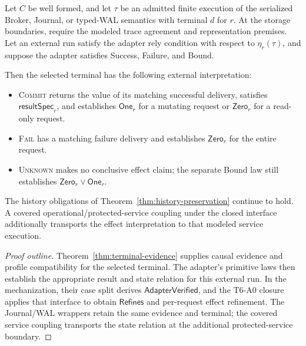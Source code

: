 \documentclass[acmsmall,screen,review,anonymous]{acmart}
\newcommand{\Unknown}{\textsc{Unknown}\xspace}
\newcommand{\Commit}{\textsc{Commit}\xspace}
\newcommand{\Fail}{\textsc{Fail}\xspace}
\begin{document}
\begin{theorem}
\label{thm:authorization-to-effect}
Let $C$ be well formed, and let $\tau$ be an admitted finite execution
of the serialized Broker, Journal, or typed-WAL semantics with terminal
$d$ for $r$. At the storage boundaries, require the modeled trace
agreement and representation premises. Let an external run satisfy
the adapter rely condition with respect to $\eta_r(\tau)$, and suppose
the adapter satisfies Success, Failure, and Bound.

Then the selected terminal has the following external interpretation:
\begin{itemize}
  \item \Commit returns the value of its matching successful delivery,
    satisfies $\mathsf{resultSpec}_r$, and establishes $\mathsf{One}_r$
    for a mutating request or $\mathsf{Zero}_r$ for a read-only request.
  \item \Fail has a matching failure delivery and establishes
    $\mathsf{Zero}_r$ for the entire request.
  \item \Unknown makes no conclusive effect claim; the separate Bound
    law still establishes $\mathsf{Zero}_r\lor\mathsf{One}_r$.
\end{itemize}
The history obligations of Theorem~\ref{thm:history-preservation}
continue to hold. A covered operational/protected-service coupling
under the closed interface additionally transports the effect
interpretation to that modeled service execution.
\end{theorem}
\begin{proof}[Proof outline]
Theorem~\ref{thm:terminal-evidence} supplies causal evidence and
profile compatibility for the selected terminal. The adapter's
primitive laws then establish the appropriate result and state
relation for this external run. In the mechanization, their case split
derives $\mathsf{AdapterVerified}$, and the T6-A0 closure applies that
interface to obtain $\mathsf{Refines}$ and per-request effect refinement.
The Journal/WAL wrappers retain the same evidence and terminal;
the covered service coupling transports the state relation at the
additional protected-service boundary.
\end{proof}
\end{document}
